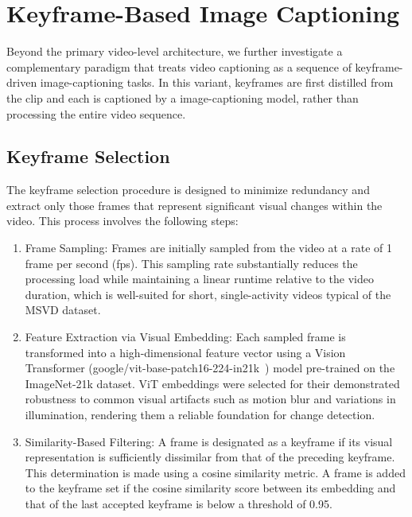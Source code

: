\section{Keyframe-Based Image Captioning}


Beyond the primary video-level architecture, we further investigate a complementary paradigm that treats video captioning as a sequence of keyframe-driven image-captioning tasks. In this variant, keyframes are first distilled from the clip and each is captioned by a image-captioning model, rather than processing the entire video sequence. 


\subsection{Keyframe Selection}

The keyframe selection procedure is designed to minimize redundancy and extract only those frames that represent significant visual changes within the video. This process involves the following steps:

\begin{enumerate}[nosep]
    \item Frame Sampling: Frames are initially sampled from the video at a rate of 1 frame per second (fps). This sampling rate substantially reduces the processing load while maintaining a linear runtime relative to the video duration, which is well-suited for short, single-activity videos typical of the MSVD dataset.
    \item Feature Extraction via Visual Embedding: Each sampled frame is transformed into a high-dimensional feature vector using a Vision Transformer (google/vit-base-patch16-224-in21k~\cite{google-vit-base-patch16-224-in21k}) model pre-trained on the ImageNet-21k dataset. ViT embeddings were selected for their demonstrated robustness to common visual artifacts such as motion blur and variations in illumination, rendering them a reliable foundation for change detection.
    \item Similarity-Based Filtering: A frame is designated as a keyframe if its visual representation is sufficiently dissimilar from that of the preceding keyframe. This determination is made using a cosine similarity metric. A frame is added to the keyframe set if the cosine similarity score between its embedding and that of the last accepted keyframe is below a threshold of 0.95.
\end{enumerate}



